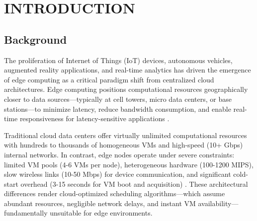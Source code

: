 \documentclass[12pt]{report}
\begin{document}

\tableofcontents
\newpage
\listoffigures
\newpage
\listoftables


\newpage
{}
\setcounter{page}{1}


\chapter{INTRODUCTION}
\label{ch:introduction}

\section{Background}

The proliferation of Internet of Things (IoT) devices, autonomous vehicles, augmented reality applications, and real-time analytics has driven the emergence of edge computing as a critical paradigm shift from centralized cloud architectures. Edge computing positions computational resources geographically closer to data sources—typically at cell towers, micro data centers, or base stations—to minimize latency, reduce bandwidth consumption, and enable real-time responsiveness for latency-sensitive applications \cite{edge_survey_2016}.

Traditional cloud data centers offer virtually unlimited computational resources with hundreds to thousands of homogeneous VMs and high-speed (10+ Gbps) internal networks. In contrast, edge nodes operate under severe constraints: limited VM pools (4-6 VMs per node), heterogeneous hardware (100-1200 MIPS), slow wireless links (10-50 Mbps) for device communication, and significant cold-start overhead (3-15 seconds for VM boot and acquisition) \cite{mec_survey_2017}. These architectural differences render cloud-optimized scheduling algorithms—which assume abundant resources, negligible network delays, and instant VM availability—fundamentally unsuitable for edge environments.
\end{document}
